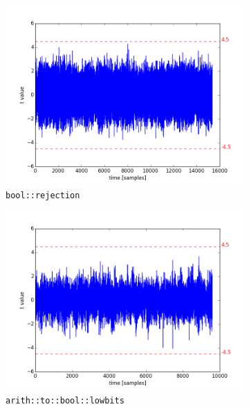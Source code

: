 \begin{figure}[h]
    \centering
    \begin{subfigure}[b]{0.45\textwidth}
        \includegraphics[width=\textwidth]{../figures/bool_rejection_10000_traces.png}
        \caption{\texttt{bool::rejection}}
        \label{fig:bool_rejection}
    \end{subfigure}
    \hfill
    \begin{subfigure}[b]{0.45\textwidth}
        \includegraphics[width=\textwidth]{../figures/arith_to_bool_lowbits_10000_traces.png}
        \caption{\texttt{arith::to::bool::lowbits}}
        \label{fig:arith_to_bool_lowbits}
    \end{subfigure}
    \vfill
    \begin{subfigure}[b]{0.45\textwidth}

\end{subfigure}
\end{figure}
